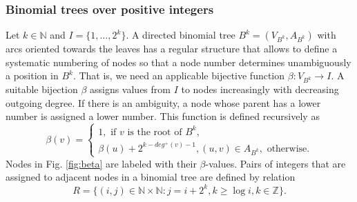 \subsubsection{Binomial trees over positive integers}

Let $k\in \mathbb{N}$ and $I=\{1,\dots,2^k\}$.
A directed binomial tree $B^k=(V_{B^k},A_{B^k})$ with arcs oriented towards the leaves has a regular structure that allows to define a systematic numbering of nodes so that a node number determines unambiguously a position in $B^k$.
That is, we need an applicable bijective function $\beta:V_{B^k}\to I$.
A suitable bijection $\beta$ assigns values from $I$ to nodes increasingly with decreasing outgoing degree.
If there is an ambiguity, a node whose parent has a lower number is assigned a lower number.
This function is defined recursively as
\begin{equation*}
\label{eq:beta}
\beta(v)=\begin{cases}
1,\text{ if } v \text{ is the root of } B^k,\\
\beta(u) + 2^{k-deg^+(v)-1}, (u,v)\in A_{B^k},\text{ otherwise}.
\end{cases}
\end{equation*}
Nodes in Fig. \ref{fig:beta} are labeled with their $\beta$-values.
Pairs of integers that are assigned to adjacent nodes in a binomial tree are defined by relation
\begin{equation*}
\label{eq:betarel}
R=\{(i,j)\in\mathbb{N}\times\mathbb{N}:j=i+2^k,k\geq\log i,k\in \mathbb{Z}\}.
\end{equation*}

